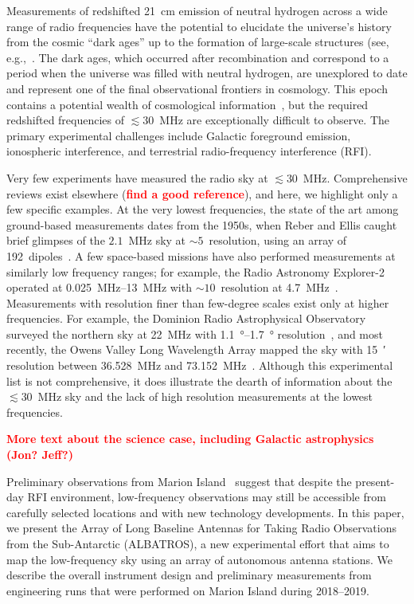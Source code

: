 \documentclass{ws-jai}
\def\albatros{ALBATROS}
\begin{document}
Measurements of redshifted \SI{21}{\cm} emission of neutral hydrogen
across a wide range of radio frequencies have the potential to
elucidate the universe's history from the cosmic ``dark ages'' up to
the formation of large-scale structures (see,
e.g.,~\citep{ska_physics,2013PhRvD..87d3002L,2014ApJ...782...66P}.
The dark ages, which occurred after recombination and correspond to a
period when the universe was filled with neutral hydrogen, are
unexplored to date and represent one of the final observational
frontiers in cosmology.  This epoch contains a potential wealth of
cosmological information~\citep{loeb_zaldarriaga, 2019arXiv190710853C,
  2019arXiv190804296K}, but the required redshifted frequencies of
$\lesssim 30$~MHz are exceptionally difficult to observe.  The primary
experimental challenges include Galactic foreground emission,
ionospheric interference, and terrestrial radio-frequency interference
(RFI).

Very few experiments have measured the radio sky at $\lesssim 30$~MHz.
Comprehensive reviews exist elsewhere (\textcolor{red}{\bf find a good
  reference}), and here, we highlight only a few specific examples.
At the very lowest frequencies, the state of the art among
ground-based measurements dates from the 1950s, when Reber and Ellis
caught brief glimpses of the $2.1$~MHz sky at $\sim
5$\degree\ resolution, using an array of 192~dipoles~\citep{reber,
  article, 1988A&A...195..372W}.  A few space-based missions have also
performed measurements at similarly low frequency ranges; for example,
the Radio Astronomy Explorer-2 operated at \SIrange{0.025}{13}{\MHz}
with $\sim 10$\degree\ resolution at
\SI{4.7}{\MHz}~\citep{1975A&A....40..365A}.  Measurements with
resolution finer than few-degree scales exist only at higher
frequencies.  For example, the Dominion Radio Astrophysical
Observatory surveyed the northern sky at \SI{22}{\MHz} with
\SIrange{1.1}{1.7}{\degree} resolution~\citep{1999A&AS..137....7R},
and most recently, the Owens Valley Long Wavelength Array mapped the
sky with \SI{15}{\arcminute} resolution between 36.528~MHz and
73.152~MHz~\citep{2018AJ....156...32E}.  Although this experimental
list is not comprehensive, it does illustrate the dearth of
information about the $\lesssim 30$~MHz sky and the lack of high
resolution measurements at the lowest frequencies.

\textcolor{red}{\bf More text about the science case, including
  Galactic astrophysics (Jon? Jeff?)}

Preliminary observations from Marion
Island~\citep{2019JAI.....850004P} suggest that despite the
present-day RFI environment, low-frequency observations may still be
accessible from carefully selected locations and with new technology
developments.  In this paper, we present the Array of Long Baseline
Antennas for Taking Radio Observations from the Sub-Antarctic
(\albatros), a new experimental effort that aims to map the
low-frequency sky using an array of autonomous antenna stations.  We
describe the overall instrument design and preliminary measurements
from engineering runs that were performed on Marion Island during
2018--2019.
\end{document}
